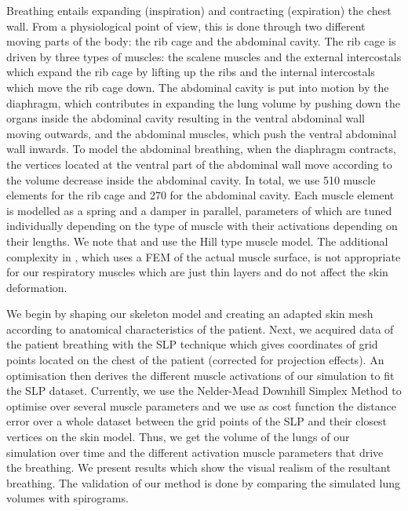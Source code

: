 \documentclass{acmsiggraph}                     %
\begin{document}
Breathing entails expanding (inspiration) and contracting (expiration) the chest wall. From a physiological point of view, this is done through two different moving parts of the body: the rib cage and the abdominal cavity. The rib cage is driven by three types of muscles: the scalene muscles and the external intercostals which expand the rib cage by lifting up the ribs and the internal intercostals which move the rib cage down. The abdominal cavity is put into motion by the diaphragm, which contributes in expanding the lung volume by pushing down the organs inside the abdominal cavity resulting in the ventral abdominal wall moving outwards, and the abdominal muscles, which push the ventral abdominal wall inwards. To model the abdominal breathing, when the diaphragm contracts, the vertices located at the ventral part of the abdominal wall move according to the volume decrease inside the abdominal cavity. In total, we use 510 muscle elements for the rib cage and 270 for the abdominal cavity. Each muscle element is modelled as a spring and a damper in parallel, parameters of which are tuned individually depending on the type of muscle with their activations depending on their lengths. We note that \cite{zordan2004breathe} and \cite{lee2009comprehensive} use the Hill type muscle model. The additional complexity in \cite{lee2009comprehensive}, which uses a FEM of the actual muscle surface, is not appropriate for our respiratory muscles which are just thin layers and do not affect the skin deformation.

We begin by shaping our skeleton model and creating an adapted skin mesh according to anatomical characteristics of the patient. Next, we acquired data of the patient breathing with the SLP technique which gives coordinates of grid points located on the chest of the patient (corrected for projection effects). An optimisation then derives the different muscle activations of our simulation to fit the SLP dataset. Currently, we use the Nelder-Mead Downhill Simplex Method to optimise over several muscle parameters and we use as cost function the distance error over a whole dataset between the grid points of the SLP and their closest vertices on the skin model. Thus, we get the volume of the lungs of our simulation over time and the different activation muscle parameters that drive the breathing. We present results which show the visual realism of the resultant breathing. The validation of our method is done by comparing the simulated lung volumes with spirograms.

\small 


\end{document}
